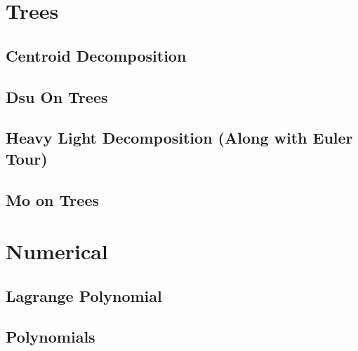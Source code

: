 \section{Trees}
\subsection{Centroid Decomposition}
\vspace{-2.2ex}
\raggedbottom
\vspace{-3.2ex}
\hrulefill
\subsection{Dsu On Trees}
\vspace{-2.2ex}
\raggedbottom
\vspace{-3.2ex}
\hrulefill
\subsection{Heavy Light Decomposition (Along with Euler Tour)}
\vspace{-2.2ex}
\raggedbottom
\vspace{-3.2ex}
\hrulefill
\subsection{Mo on Trees}
\vspace{-2.2ex}
\raggedbottom
\vspace{-3.2ex}
\hrulefill

\section{Numerical}
\subsection{Lagrange Polynomial}
\vspace{-2.2ex}
\raggedbottom
\vspace{-3.2ex}
\hrulefill
\subsection{Polynomials}
\vspace{-2.2ex}
\raggedbottom
\vspace{-3.2ex}
\hrulefill

